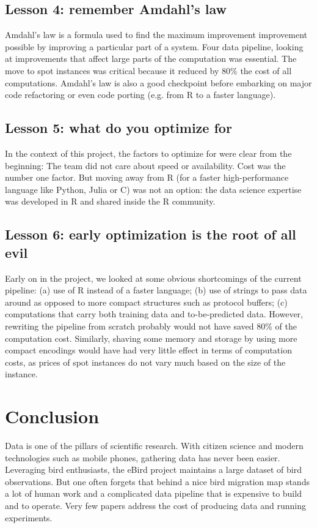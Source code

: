 \documentclass{acm_proc_article-sp}
\begin{document}
\subsection*{Lesson 4: remember Amdahl's law}
Amdahl's law is a formula used to find the maximum improvement improvement possible by improving a particular part of a system. Four data pipeline, looking at improvements that affect large parts of the computation was essential. The move to spot instances was critical because it reduced by 80\% the cost of all computations. Amdahl's law is also a good checkpoint before embarking on  major code refactoring or even code porting (e.g. from R to a faster language). 

\subsection*{Lesson 5: what do you optimize for}
In the context of this project, the factors to optimize for were clear from the beginning:
The team did not care about speed or availability.
Cost was the number one factor.
But moving away from R (for a faster high-performance language like Python, Julia or C) was not an option: the data science expertise was developed in R and shared inside the R community.

\subsection*{Lesson 6: early optimization is the root of all evil}
Early on in the project, we looked at some obvious shortcomings of the current pipeline: (a) use of R instead of a faster language; (b) use of strings to pass data around as opposed to more compact structures such as protocol buffers; (c) computations that carry both training data and to-be-predicted data.
However, rewriting the pipeline from scratch probably would not have saved 80\% of the computation cost. Similarly, shaving some memory and storage by using more compact encodings would have had very little effect in terms of computation costs, as prices of spot instances  do not vary much based on the size of the instance.

\section{Conclusion}\label{sec::conclusion}
Data is one of the pillars of scientific research. With citizen science and modern technologies such as mobile phones, gathering data has never been easier. Leveraging bird enthusiasts, the eBird project maintains a large dataset of bird observations. But one often forgets that behind a nice bird migration map stands a lot of human work and a complicated data pipeline that is expensive to build and to operate. Very few papers address the cost of producing data and running experiments.
\end{document}
